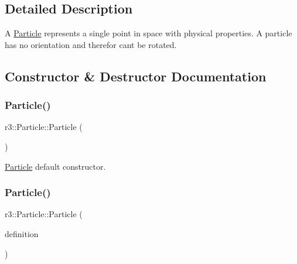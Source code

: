 \subsection{Detailed Description}
A \mbox{\hyperlink{classr3_1_1_particle}{Particle}} represents a single point in space with physical properties. A particle has no orientation and therefor can\textquotesingle{}t be rotated. 

\subsection{Constructor \& Destructor Documentation}
\mbox{\label{classr3_1_1_particle_a72d4ae82278e293bf0933a1aabbe9ac3}} 
\subsubsection{\texorpdfstring{Particle()}{Particle()}\hspace{0.1cm}{\footnotesize\ttfamily [1/2]}}
{\footnotesize\ttfamily r3\+::\+Particle\+::\+Particle (\begin{DoxyParamCaption}{ }\end{DoxyParamCaption})\hspace{0.3cm}{\ttfamily [explicit]}}



\mbox{\hyperlink{classr3_1_1_particle}{Particle}} default constructor. 

\mbox{\label{classr3_1_1_particle_a28a47b80f79433db842a47aca835003a}} 
\subsubsection{\texorpdfstring{Particle()}{Particle()}\hspace{0.1cm}{\footnotesize\ttfamily [2/2]}}
{\footnotesize\ttfamily r3\+::\+Particle\+::\+Particle (\begin{DoxyParamCaption}\item[{const \mbox{\hyperlink{structr3_1_1_particle_def}{Particle\+Def}} \&}]{definition }\end{DoxyParamCaption})\hspace{0.3cm}{\ttfamily [explicit]}}



